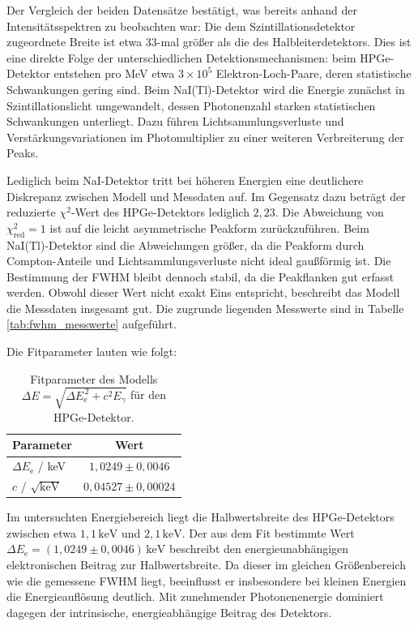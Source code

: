 Der Vergleich der beiden Datensätze bestätigt, was bereits anhand der Intensitätsspektren zu beobachten war: Die dem Szintillationsdetektor zugeordnete Breite ist etwa 33-mal größer als die des Halbleiterdetektors.
Dies ist eine direkte Folge der unterschiedlichen Detektionsmechanismen: beim HPGe-Detektor entstehen pro MeV etwa $3\times10^5$ Elektron-Loch-Paare, deren statistische Schwankungen gering sind. Beim NaI(Tl)-Detektor wird die Energie zunächst in Szintillationslicht umgewandelt, dessen Photonenzahl starken statistischen Schwankungen unterliegt. Dazu führen Lichtsammlungsverluste und Verstärkungsvariationen im Photomultiplier zu einer weiteren Verbreiterung der Peaks.

Lediglich beim NaI-Detektor tritt bei höheren Energien eine deutlichere Diskrepanz zwischen Modell und Messdaten auf.
Im Gegensatz dazu beträgt der reduzierte $\chi^2$-Wert des HPGe-Detektors lediglich $2,23$.
Die Abweichung von $\chi^2_{\mathrm{red}}=1$ ist auf die leicht asymmetrische Peakform zurückzuführen. Beim NaI(Tl)-Detektor sind die Abweichungen größer, da die Peakform durch Compton-Anteile und Lichtsammlungsverluste nicht ideal gaußförmig ist.
Die Bestimmung der FWHM bleibt dennoch stabil, da die Peakflanken gut erfasst werden.
 Obwohl dieser Wert nicht exakt Eins entspricht, beschreibt das Modell die Messdaten insgesamt gut. Die zugrunde liegenden Messwerte sind in Tabelle \ref{tab:fwhm_messwerte} aufgeführt.

Die Fitparameter lauten wie folgt:

\begin{table}[H]
    \centering
    \caption{Fitparameter des Modells $\Delta E=\sqrt{\Delta E_\mathrm{e}^{\,2}+c^2E_\gamma}$ für den HPGe-Detektor.}
    \label{tab:fwhm_parameter}
    \begin{tabular}{lc}
        \toprule
        Parameter & Wert \\
        \midrule
        $\Delta E_\mathrm{e}$ / keV & $1,0249 \pm 0,0046$ \\
        $c$ / $\sqrt{\mathrm{keV}}$ & $0,04527 \pm 0,00024$ \\
        \bottomrule
    \end{tabular}
\end{table}

Im untersuchten Energiebereich liegt die Halbwertsbreite des HPGe-Detektors zwischen etwa $1,1\,\mathrm{keV}$ und $2,1\,\mathrm{keV}$. Der aus dem Fit bestimmte Wert $\Delta E_\mathrm{e}=(1,0249\pm0,0046)\,\mathrm{keV}$ beschreibt den energieunabhängigen elektronischen Beitrag zur Halbwertsbreite. Da dieser im gleichen Größenbereich wie die gemessene FWHM liegt, beeinflusst er insbesondere bei kleinen Energien die Energieauflösung deutlich. Mit zunehmender Photonenenergie dominiert dagegen der intrinsische, energieabhängige Beitrag des Detektors.
